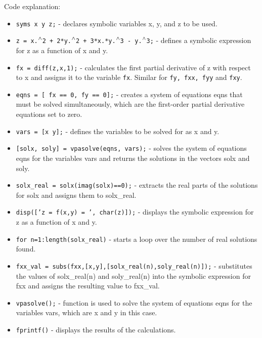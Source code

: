 Code explanation: 
\begin{itemize}
  \item \texttt{\color{mygreen}syms x y z;} - declares symbolic variables x, y, and z to be used.
  \item \texttt{\color{mygreen}z = x.$\caret$2 + 2*y.$\caret$2 + 3*x.*y.$\caret$3 - y.$\caret$3;} - defines a symbolic expression for z as a function of x and y.
  \item \texttt{\color{mygreen}fx = diff(z,x,1);} - calculates the first partial derivative of z with respect to x and assigns it to the variable \texttt{\color{mygreen}fx}. Similar for \texttt{\color{mygreen}fy, fxx, fyy} and \texttt{\color{mygreen}fxy}.
  \item \texttt{\color{mygreen}eqns = [ fx == 0, fy == 0];} - creates a system of equations eqns that must be solved simultaneously, which are the first-order partial derivative equations set to zero.
  \item \texttt{\color{mygreen}vars = [x y];} - defines the variables to be solved for as x and y.
  \item \texttt{\color{mygreen}[solx, soly] = vpasolve(eqns, vars);} - solves the system of equations eqns for the variables vars and returns the solutions in the vectors solx and soly.
  \item \texttt{\color{mygreen}solx\_real = solx(imag(solx)==0);} - extracts the real parts of the solutions for solx and assigns them to solx\_real.
  \item \texttt{\color{mygreen}disp(['z = f(x,y) = ', char(z)]);} - displays the symbolic expression for z as a function of x and y.
  \item \texttt{\color{mygreen}for n=1:length(solx\_real)} - starts a loop over the number of real solutions found.
  \item \texttt{\color{mygreen}fxx\_val = subs(fxx,[x,y],[solx\_real(n),soly\_real(n)]);} - substitutes the values of solx\_real(n) and soly\_real(n) into the symbolic expression for fxx and assigns the resulting value to fxx\_val.
  \item \texttt{\color{mygreen}vpasolve();} - function is used to solve the system of equations eqns for the variables vars, which are x and y in this case.
  \item \texttt{\color{mygreen}fprintf()} - displays the results of the calculations.
\end{itemize}

